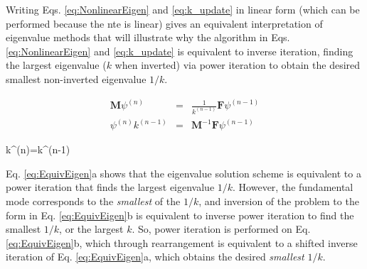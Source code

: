 Writing Eqs. \eqref{eq:NonlinearEigen} and \eqref{eq:k_update} in linear form (which can be performed because the \gls{nte} is linear) gives an equivalent interpretation of eigenvalue methods that will illustrate why the algorithm in Eqs. \eqref{eq:NonlinearEigen} and \eqref{eq:k_update} is equivalent to inverse iteration, finding the largest eigenvalue (\(k\) when inverted) via power iteration to obtain the desired smallest non-inverted eigenvalue \(1/k\).

\begin{subequations}
\label{eq:EquivEigen}
\begin{eqnarray}
\textbf{M}\psi^{(n)}&=&\frac{1}{k^{(n-1)}}\textbf{F}\psi^{(n-1)}\\
\psi^{(n)}k^{(n-1)}&=&\textbf{M}^{-1}\textbf{F}\psi^{(n-1)}
\end{eqnarray}
\end{subequations}

\beq
k^{(n)}=k^{(n-1)}
\eeq

Eq. \eqref{eq:EquivEigen}a shows that the eigenvalue solution scheme is equivalent to a power iteration that finds the largest eigenvalue \(1/k\). However, the fundamental mode corresponds to the {\it smallest} of the \(1/k\), and inversion of the problem to the form in Eq. \eqref{eq:EquivEigen}b is equivalent to inverse power iteration to find the smallest \(1/k\), or the largest \(k\). So, power iteration is performed on Eq. \eqref{eq:EquivEigen}b, which through rearrangement is equivalent to a shifted inverse iteration of Eq. \eqref{eq:EquivEigen}a, which obtains the desired {\it smallest} \(1/k\).
